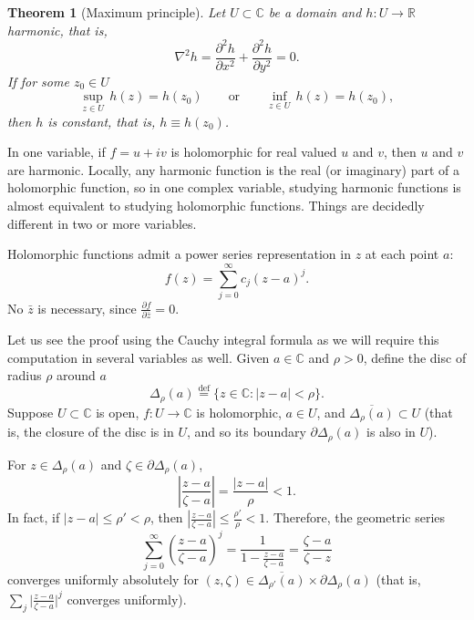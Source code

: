 \documentclass[12pt,openany]{book}
\newcommand{\sabs}[1]{\lvert {#1} \rvert}
\newcommand{\abs}[1]{\left\lvert {#1} \right\rvert}
\newcommand{\C}{{\mathbb{C}}}
\newcommand{\R}{{\mathbb{R}}}
\theoremstyle{plain}
\newtheorem{thm}{Theorem}[section]
\theoremstyle{remark}
\theoremstyle{definition}
\theoremstyle{exercise}
\theoremstyle{example}
\begin{document}
\begin{thm}[Maximum principle]
Let $U \subset \C$ be a domain and $h \colon U \to \R$
harmonic, that is,
%
\begin{equation*}
\nabla^2 h = \frac{\partial^2 h}{\partial x^2} + \frac{\partial^2 h}{\partial
y^2} = 0 .
\end{equation*}
If for some $z_0 \in U$
\begin{equation*}
\sup_{z \in U} \, h(z) = h(z_0)
\qquad \text{or} \qquad
\inf_{z \in U} \, h(z) = h(z_0) ,
\end{equation*}
then $h$ is constant, that is, $h \equiv h(z_0)$.
\end{thm}

In one variable, if $f = u+iv$ is holomorphic for real valued $u$ and $v$,
then $u$ and $v$ are harmonic.  Locally, any harmonic function is
the real (or imaginary) part of a holomorphic function, so in
one complex variable, studying 
harmonic functions is almost equivalent to studying holomorphic
functions.  Things are decidedly different
in two or more variables.

\medskip

Holomorphic functions admit a power series representation in $z$
at each point $a$:
\begin{equation*}
f(z) = \sum_{j=0}^\infty c_j {(z-a)}^j .
\end{equation*}
No $\bar{z}$ is necessary,
since $\frac{\partial f}{\partial \bar{z}} = 0$.

Let us see the proof using the Cauchy integral formula as we will
require this computation in several variables as well.
Given $a \in \C$ and $\rho > 0$, define the disc of radius $\rho$ around $a$
%
\begin{equation*}
\Delta_\rho(a)
\overset{\text{def}}{=}
\bigl\{ z \in \C : \sabs{z-a} < \rho \bigr\} .
\end{equation*}
Suppose $U \subset \C$ is open, $f \colon U \to \C$ is holomorphic,
$a \in U$, and $\overline{\Delta_\rho(a)} \subset U$ (that is, the closure
of the disc is in $U$, and so its boundary $\partial \Delta_\rho(a)$ is also in $U$).

For $z \in \Delta_\rho(a)$ and $\zeta \in \partial \Delta_\rho(a)$, 
\begin{equation*}
\abs{\frac{z-a}{\zeta-a}} =
\frac{\sabs{z-a}}{\rho} < 1 .
\end{equation*}
In fact, if $\sabs{z-a} \leq \rho' < \rho$, then
$\abs{\frac{z-a}{\zeta-a}} \leq \frac{\rho'}{\rho} < 1$.  Therefore,
the geometric series
\begin{equation*}
\sum_{j=0}^\infty
{\left(\frac{z-a}{\zeta-a}\right)}^j
=
\frac{1}{1-
\frac{z-a}{\zeta-a}}
=
\frac{\zeta-a}{\zeta-z}
\end{equation*}
converges uniformly absolutely for $(z,\zeta) \in \overline{\Delta_{\rho'}(a)}
\times \partial \Delta_\rho(a)$ (that is, $\sum_j {\bigl\lvert
\frac{z-a}{\zeta-a} \bigr\rvert}^j$
converges uniformly).
\end{document}
